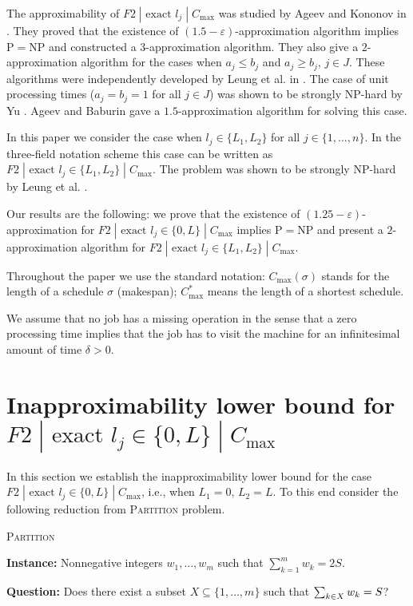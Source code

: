 \documentclass[12pt,a4paper]{article}
\begin{document}
The approximability of $F2\;|\mbox{ exact }l_j \;|\;C_{\max}$ was
studied by Ageev and Kononov in \cite{AK}. They proved that the
existence of $(1.5-\varepsilon)$-approxi\-mation algorithm implies
P$=$NP and constructed a $3$-approxi\-mation algorithm. They also
give a $2$-approximation algorithm for the cases when $a_j\leq b_j$
and $a_j\geq b_j$, $j\in J$. These algorithms were independently
developed by Leung et al. in \cite{LLZ}. The case of unit processing
times ($a_j=b_j=1$ for all $j\in J$) was shown to be strongly
NP-hard by Yu \cite{Yu,YHL}. Ageev and Baburin \cite{AB} gave a
$1.5$-approximation algorithm for solving this case.

In this paper we consider the case when $l_j\in \{L_1,L_2\}$ for all
$j\in \{1,\ldots , n\}$. In the three-field notation scheme this
case can be written as $F2\;|\mbox{ exact }l_j\in
\{L_1,L_2\}\;|\;C_{\max}$. The problem was shown to be strongly
NP-hard by Leung et al. \cite{LLZ}.

Our results are the following: we prove that the existence of
$(1.25-\varepsilon)$-approximation for $F2\;|\mbox{ exact }l_j\in
\{0,L\}\;|\;C_{\max}$ implies P$=$NP and present a $2$-approximation
algorithm for $F2\;|\mbox{ exact }l_j\in \{L_1,L_2\}\;|\;C_{\max}$.

Throughout the paper we use the standard notation:
$C_{\max}(\sigma)$ stands for the length of a schedule $\sigma$
(makespan); $C_{\max}^*$ means the length of a shortest schedule.

We assume that no job has a missing operation in the sense that a
zero processing time implies that the job has to visit the machine
for an infinitesimal amount of time $\delta > 0$.


\section{Inapproximability lower bound for \\ $F2\;|\mbox{ exact }l_j\in \{0,L\}\;|\;C_{\max}$}

In this section we establish the inapproximability lower bound for
the case $F2\;|\mbox{ exact }l_j\in \{0,L\}\;|\;C_{\max}$, i.e.,
when $L_1=0$, $L_2=L$. To this end consider the following reduction
from \textsc{Partition} problem.

\medskip
\textsc{Partition}

\label{sec:1} {\bf Instance:} Nonnegative integers $w_1,\ldots,w_m$
such that $\sum_{k=1}^{m}w_k=2S$.

\medskip
{\bf Question:} Does there exist a subset $X\subseteq \{1,\ldots,
m\}$ such that $ \sum_{k\in X}w_k \\ =S$?
\medskip
\end{document}
